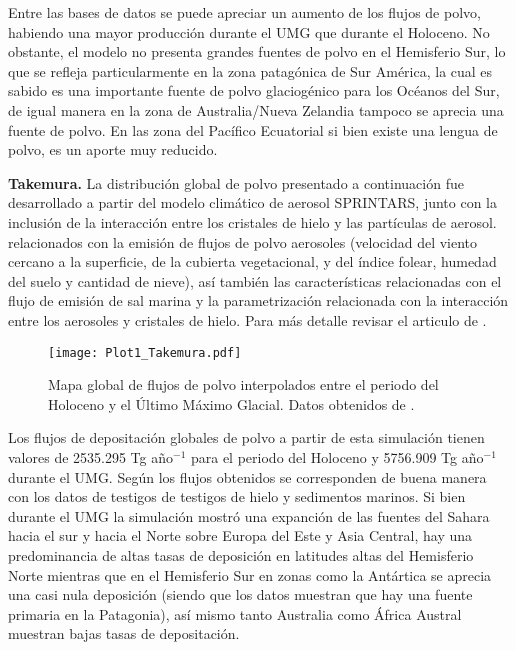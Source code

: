 Entre las bases de datos se puede apreciar un aumento de los flujos de polvo, habiendo una mayor producción durante el UMG que durante el Holoceno. No obstante, el modelo no presenta grandes fuentes de polvo en el Hemisferio Sur, lo que se refleja particularmente en la zona patagónica de Sur América, la cual es sabido es una importante fuente de polvo glaciogénico para los Océanos del Sur, de igual manera en la zona de Australia/Nueva Zelandia tampoco se aprecia una fuente de polvo. En las zona del Pacífico Ecuatorial si bien existe una lengua de polvo, es un aporte muy reducido.   

{\bf Takemura.} La distribuci\'on global de polvo presentado a continuaci\'on fue desarrollado a partir del modelo clim\'atico de aerosol SPRINTARS, junto con la inclusi\'on de la interacci\'on entre los cristales de hielo y las part\'iculas de aerosol. relacionados con la emisión de flujos de polvo aerosoles (velocidad del viento cercano a la superficie, de la cubierta vegetacional, y del índice folear, humedad del suelo y cantidad de nieve), así también las características relacionadas con el flujo de emisión de sal marina y la parametrización relacionada con la interacción entre los aerosoles y cristales de hielo. Para más detalle revisar el articulo de \cite{takemura2009simulation}.

\begin{figure}[H]
\centering
  \texttt{[image: Plot1\_Takemura.pdf]}
  \caption[Flujos de polvo \cite{takemura2009simulation}]{Mapa global de flujos de polvo interpolados entre el periodo del Holoceno y el \'Ultimo M\'aximo Glacial. Datos obtenidos de \cite{takemura2009simulation}.}
  \label{fig:Takemura}
\end{figure}

Los flujos de depositación globales de polvo a partir de esta simulación tienen valores de 2535.295 Tg año$^{-1}$ para el periodo del Holoceno y 5756.909 Tg año$^{-1}$ durante el UMG. Según \cite{takemura2009simulation} los flujos obtenidos se corresponden de buena manera con los datos de testigos de testigos de hielo y sedimentos marinos. Si bien durante el UMG la simulación mostró una expanción de las fuentes del Sahara hacia el sur y hacia el Norte sobre Europa del Este y Asia Central, hay una predominancia de altas tasas de deposición en latitudes altas del Hemisferio Norte mientras que en el Hemisferio Sur en zonas como la Antártica se aprecia una casi nula deposición (siendo que los datos muestran que hay una fuente primaria en la Patagonia), así mismo tanto Australia como África Austral muestran bajas tasas de depositación. 

